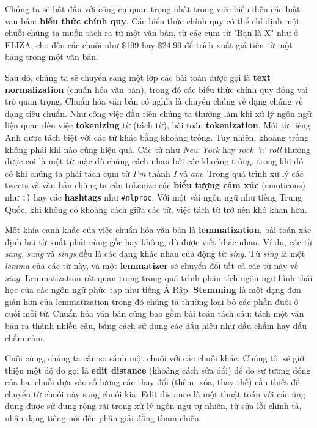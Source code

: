 Chúng ta sẽ bắt đầu với công cụ quan trọng nhất trong việc biểu diễn các luật văn bản: \textbf{biểu thức chính quy}. Các biểu thức chính quy có thể chỉ định một chuỗi chúng ta muốn tách ra từ một văn bản, từ các cụm từ "Bạn là X" như ở ELIZA, cho đến các chuỗi như \$199 hay \$24.99 để trích xuất giá tiền từ một bảng trong một văn bản.

Sau đó, chúng ta sẽ chuyển sang một lớp các bài toán được gọi là \textbf{text normalization} (chuẩn hóa văn bản), trong đó các biểu thức chính quy đóng vai trò quan trọng. Chuẩn hóa văn bản có nghĩa là chuyển chúng về dạng chúng về dạng tiêu chuẩn. Như công việc đầu tiên chúng ta thường làm khi xử lý ngôn ngữ liện quan đến việc \textbf{tokenizing} từ (tách từ), bài toán \textbf{tokenization}. Mỗi từ tiếng Anh được tách biệt với các từ khác bằng khoảng trống. Tuy nhiên, khoảng trống không phải khi nào cũng hiệu quả. Các từ như \textit{New York} hay \textit{rock 'n' roll} thường được coi là một từ mặc dù chúng cách nhau bởi các khoảng trống, trong khi đó có khi chúng ta phải tách cụm từ \textit{I'm} thành \textit{I} và \textit{am}. Trong quá trình xử lý các tweets và văn bản chúng ta cần tokenize các \textbf{biểu tượng cảm xúc} (emoticons) như \verb|:)| hay các \textbf{hashtags} như \verb|#nlproc|. Với một vài ngôn ngữ như tiếng Trung Quốc, khi không có khoảng cách giữa các từ, việc tách từ trở nên khó khăn hơn.

Một khía cạnh khác của việc chuẩn hóa văn bản là \textbf{lemmatization}, bài toán xác định hai từ xuất phát cùng gốc hay không, dù được viết khác nhau. Ví dụ, các từ \textit{sang}, \textit{sung} và \textit{sings} đều là các dạng khác nhau của động từ \textit{sing}. Từ \textit{sing} là một \textit{lemma} của các từ này, và một \textbf{lemmatizer} sẽ chuyển đổi tất cả các từ này về \textit{sing}. Lemmatization rất quan trọng trong quá trình phân tích ngôn ngữ hình thái học của các ngôn ngữ phức tạp như tiếng Ả Rập. \textbf{Stemming} là một dạng đơn giản hơn của lemmatization trong đó chúng ta thường loại bỏ các phần đuôi ở cuối mỗi từ. Chuẩn hóa văn bản cũng bao gồm bài toán tách câu: tách một văn bản ra thành nhiều câu, bằng cách sử dụng các dấu hiệu như dấu chấm hay dấu chấm cảm.

Cuối cùng, chúng ta cần so sánh một chuỗi với các chuỗi khác. Chúng tôi sẽ giới thiệu một độ đo gọi là \textbf{edit distance} (khoảng cách sửa đổi) để đo sự tương đồng của hai chuỗi dựa vào số lượng các thay đổi (thêm, xóa, thay thế) cần thiết để chuyển từ chuỗi này sang chuỗi kia. Edit distance là một thuật toán với các ứng dụng được sử dụng rộng rãi trong xử lý ngôn ngữ tự nhiên, từ sửa lỗi chính tả, nhận dạng tiếng nói đến phân giải đồng tham chiếu.

